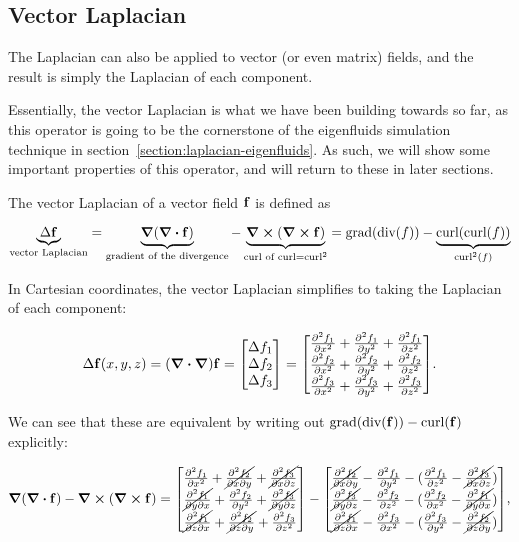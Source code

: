 \subsection*{Vector Laplacian}
\label{section:vector-laplacian}
The Laplacian can also be applied to vector (or even matrix) fields, and the
result is simply the Laplacian of each component.

Essentially, the vector Laplacian is what we have been building towards so far,
as this operator is going to be the cornerstone of the eigenfluids simulation
technique in section~\ref{section:laplacian-eigenfluids}. As such, we will show
some important properties of this operator, and will return to these in later
sections.

The vector Laplacian of a vector field $\vb{f}$ is defined as

$$\underbrace{\Delta \vb{f}}_{\text{vector Laplacian}}
= \underbrace{\grad(\div{\vb{f}})}_{\text{gradient of the divergence}}
- \underbrace{\curl(\curl{\vb{f}})}_{\text{curl of curl} = \text{curl}^2}
= \text{grad}(\text{div}(f))
- \underbrace{\text{curl}(\text{curl}(f))}_{\text{curl}^2(f)}$$

In Cartesian coordinates, the vector Laplacian simplifies to taking the
Laplacian of each component:

\begin{equation}
    \Delta\vb{f}(x, y, z) = (\grad\vdot\grad)\vb{f} = 
    \mqty[ \Delta f_1 \\ \Delta f_2 \\ \Delta f_3 ] =
    \mqty[
        \pdv[2]{f_1}{x} + \pdv[2]{f_1}{y} + \pdv[2]{f_1}{z}\\
        \pdv[2]{f_2}{x} + \pdv[2]{f_2}{y} + \pdv[2]{f_2}{z}\\
        \pdv[2]{f_3}{x} + \pdv[2]{f_3}{y} + \pdv[2]{f_3}{z}
    ].
    \label{eq:laplacian}
\end{equation}

We can see that these are equivalent by writing out
$\text{grad}(\text{div}(\vb{f})) - \text{curl}(\vb{f})$ explicitly:

\begin{equation}\label{eq:graddiv-identity}
    \grad(\div{\vb{f}}) - \curl(\curl{\vb{f}}) =
    \mqty[
        \pdv[2]{f_1}{x} + 
        \cancel{\pdv[2]{f_2}{x}{y}} + 
        \cancel{\pdv[2]{f_3}{x}{z}}
        \\
        \cancel{\pdv[2]{f_1}{y}{x}} + 
        \pdv[2]{f_2}{y} + 
        \cancel{\pdv[2]{f_3}{y}{z}}
        \\
        \cancel{\pdv[2]{f_1}{z}{x}} +
        \cancel{\pdv[2]{f_2}{z}{y}} + 
        \pdv[2]{f_3}{z}
    ] -
    \mqty[
        \cancel{\pdv[2]{f_2}{x}{y}} - 
        \pdv[2]{f_1}{y} - 
        (\pdv[2]{f_1}{z} - \cancel{\pdv[2]{f_3}{x}{z}})
        \\
        \cancel{\pdv[2]{f_3}{y}{z}} - 
        \pdv[2]{f_2}{z} - 
        ({\pdv[2]{f_2}{x}} - \cancel{\pdv[2]{f_1}{y}{x}})
        \\
        \cancel{\pdv[2]{f_1}{z}{x}} - 
        \pdv[2]{f_3}{x} - 
        (\pdv[2]{f_3}{y} - \cancel{\pdv[2]{f_2}{z}{y}})
    ],
\end{equation}

